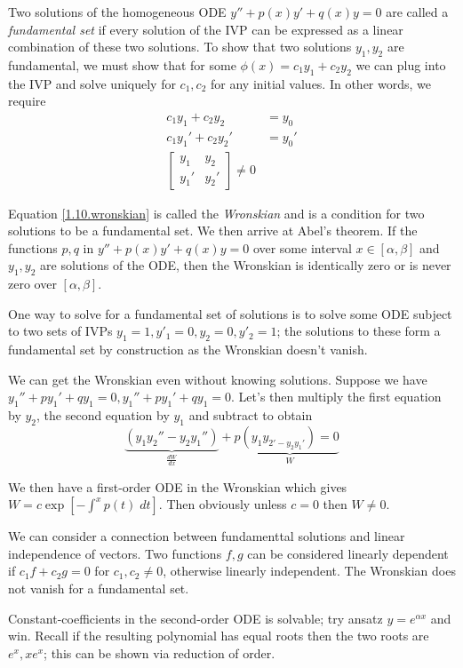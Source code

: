 \documentclass[10pt]{report}
\begin{document}
Two solutions of the homogeneous ODE $y'' + p(x)y' + q(x)y = 0$ are called a \emph{fundamental set} if every solution of the IVP can be expressed as a linear combination of these two solutions. To show that two solutions $y_1, y_2$ are fundamental, we must show that for some $\phi(x) = c_1y_1 + c_2y_2$ we can plug into the IVP and solve uniquely for $c_1, c_2$ for any initial values. In other words, we require
\begin{align}
    c_1y_1 + c_2y_2 &= y_0\\
    c_1y_1' + c_2y_2' &= y_0'\\
    \begin{bmatrix} y_1 & y_2\\y_1' & y_2' \end{bmatrix} \neq 0
    \label{1.10.wronskian}
\end{align}

Equation \ref{1.10.wronskian} is called the \emph{Wronskian} and is a condition for two solutions to be a fundamental set. We then arrive at Abel's theorem. If the functions $p,q$ in $y'' + p(x) y' + q(x)y = 0$ over some interval $x\in[\alpha,\beta]$ and $y_1,y_2$ are solutions of the ODE, then the Wronskian is identically zero or is never zero over $\left[ \alpha,\beta \right]$.

One way to solve for a fundamental set of solutions is to solve some ODE subject to two sets of IVPs $y_1 = 1, y'_1 = 0, y_2=0, y'_2=1$; the solutions to these form a fundamental set by construction as the Wronskian doesn't vanish. 

We can get the Wronskian even without knowing solutions. Suppose we have $y_1'' + py_1' + qy_1 = 0, y_1'' + py_1' + qy_1 = 0$. Let's then multiply the first equation by $y_2$, the  second equation by $y_1$ and subtract to obtain
$$\underbrace{\left( y_1y_2'' - y_2y_1'' \right)}_{\frac{dW}{dx}} + p\underbrace{\left( y_1y_{2' - y_2y_1'} \right) = 0}_{W}$$

We then have a first-order ODE in the Wronskian which gives $W = c\exp\left[ -\int^x p(t)\; dt \right]$. Then obviously unless $c=0$ then $W \neq 0$. 

We can consider a connection between fundamenttal solutions and linear independence of vectors. Two functions $f,g$ can be considered linearly dependent if $c_1f + c_2g = 0$ for $c_1, c_2 \neq 0$, otherwise linearly independent. The Wronskian does not vanish for a fundamental set.

Constant-coefficients in the second-order ODE is solvable; try ansatz $y = e^{\alpha x}$ and win. Recall if the resulting polynomial has equal roots then the two roots are $e^x, xe^x$; this can be shown via reduction of order. 
\end{document}

